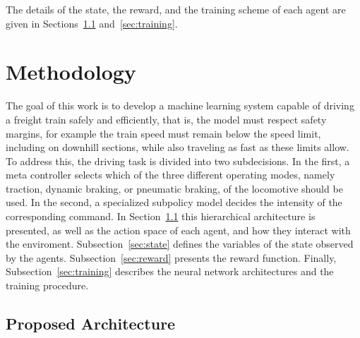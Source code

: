\documentclass[preprint,10pt]{elsarticle}
\begin{document}

The details of the state, the reward, and the training scheme of each agent are given in Sections~\ref{sec:architecture} and~\ref{sec:training}.

\section{Methodology} \label{sec:methodology}

The goal of this work is to develop a machine learning system capable of driving a freight train safely and efficiently, that is, the model must respect safety margins, for example the train speed must remain below the speed limit, including on downhill sections, while also traveling as fast as these limits allow. To address this, the driving task is divided into two subdecisions. In the first, a meta controller selects which of the three different operating modes, namely traction, dynamic braking, or pneumatic braking, of the locomotive should be used. In the second, a specialized subpolicy model decides the intensity of the corresponding command. In Section~\ref{sec:architecture} this hierarchical architecture is presented, as well as the action space of each agent, and how they interact with the enviroment. Subsection~\ref{sec:state} defines the variables of the state observed by the agents. Subsection~\ref{sec:reward} presents the reward function. Finally, Subsection~\ref{sec:training} describes the neural network architectures and the training procedure.

\subsection{Proposed Architecture} \label{sec:architecture}
\end{document}
